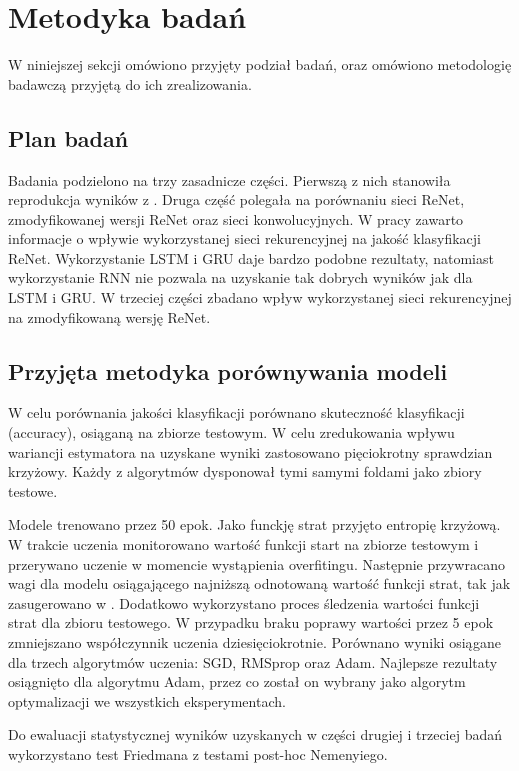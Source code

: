 \documentclass[oneside, mag]{mgr}
\begin{document}
\section{Metodyka badań}
W niniejszej sekcji omówiono przyjęty podział badań, oraz omówiono metodologię badawczą przyjętą do ich zrealizowania.

\subsection{Plan badań}
Badania podzielono na trzy zasadnicze części. Pierwszą z nich stanowiła reprodukcja wyników z \cite{DBLP:journals/corr/VisinKCMCB15}. Druga część polegała na porównaniu sieci ReNet, zmodyfikowanej wersji ReNet oraz sieci konwolucyjnych. W pracy \cite{DBLP:journals/corr/VisinKCMCB15} zawarto informacje o wpływie wykorzystanej sieci rekurencyjnej na jakość klasyfikacji ReNet. Wykorzystanie LSTM i GRU daje bardzo podobne rezultaty, natomiast wykorzystanie RNN nie pozwala na uzyskanie tak dobrych wyników jak dla LSTM i GRU. W trzeciej części zbadano wpływ wykorzystanej sieci rekurencyjnej na zmodyfikowaną wersję ReNet.

\subsection{Przyjęta metodyka porównywania modeli}
W celu porównania jakości klasyfikacji porównano skuteczność klasyfikacji (accuracy), osiąganą na zbiorze testowym. W celu zredukowania wpływu wariancji estymatora na uzyskane wyniki zastosowano pięciokrotny sprawdzian krzyżowy. Każdy z algorytmów dysponował tymi samymi foldami jako zbiory testowe. 

Modele trenowano przez 50 epok. Jako funckję strat przyjęto entropię krzyżową. W trakcie uczenia monitorowano wartość funkcji start na zbiorze testowym i przerywano uczenie w momencie wystąpienia overfitingu. Następnie przywracano wagi dla modelu osiągającego najniższą odnotowaną wartość funkcji strat, tak jak zasugerowano w \cite{Goodfellow-et-al-2016}. Dodatkowo wykorzystano proces śledzenia wartości funkcji strat dla zbioru testowego. W przypadku braku poprawy wartości przez 5 epok zmniejszano współczynnik uczenia dziesięciokrotnie. Porównano wyniki osiągane dla trzech algorytmów uczenia: SGD, RMSprop oraz Adam. Najlepsze rezultaty osiągnięto dla algorytmu Adam, przez co został on wybrany jako algorytm optymalizacji we wszystkich eksperymentach.

Do ewaluacji statystycznej wyników uzyskanych w części drugiej i trzeciej badań wykorzystano test Friedmana z testami post-hoc Nemenyiego. 
\end{document}
